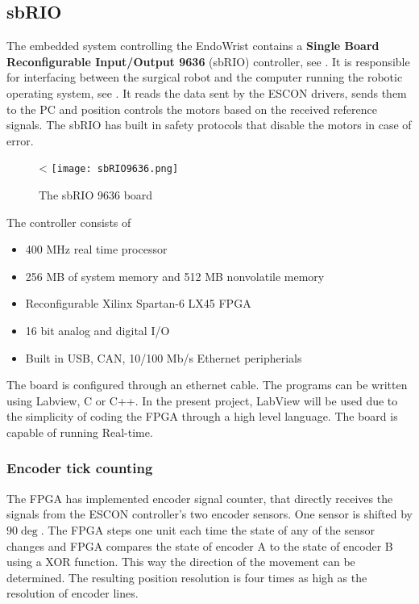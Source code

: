 \subsection{sbRIO}

The embedded system controlling the EndoWrist contains a \textbf{Single Board Reconfigurable Input/Output 9636} (sbRIO) controller, see . It is responsible for interfacing between the surgical robot and the computer running the robotic operating system\cite{Chris_Surgical}, see . It reads the data sent by the ESCON drivers, sends them to the PC and position controls the motors based on the received reference signals. The sbRIO has built in safety protocols that disable the motors in case of error.

\begin{figure}[H]
	\centering
		\centering
<		\texttt{[image: sbRIO9636.png]}
		\caption{The sbRIO 9636 board\cite{sbRIO9636Pic}}
		\label{fig:sbRIO9636}
\end{figure}


The controller consists of
\begin{itemize}
	\item 400 MHz real time processor
	\item 256 MB of system memory and 512 MB nonvolatile memory
	\item Reconfigurable Xilinx Spartan-6 LX45 FPGA
	\item 16 bit analog and digital I/O
	\item Built in USB, CAN, 10/100 Mb/s Ethernet peripherials
\end{itemize}

The board is configured through an ethernet cable. The programs can be written using Labview, C or C++. In the present project, LabView will be used due to the simplicity of coding the FPGA through a high level language. The board is capable of running Real-time. %








\subsubsection{Encoder tick counting}\label{encount}
The FPGA has implemented encoder signal counter, that directly receives the signals from  the ESCON controller's two encoder sensors. One sensor is shifted by $90\deg$. The FPGA steps one unit each time the state of any of the sensor changes and FPGA compares the state of encoder A to the state of encoder B using a XOR function. This way the direction of the movement can be determined. The resulting position resolution is four times as high as the resolution of encoder lines.

